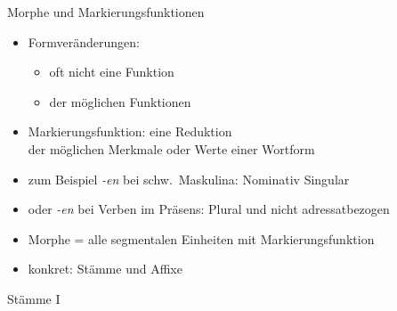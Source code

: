 \begin{frame}
  {Morphe und Markierungsfunktionen}
  \pause
  \begin{itemize}[<+->]
    \item Formveränderungen:
      \begin{itemize}[<+->]
        \item oft nicht \alert{eine} Funktion
        \item {} der möglichen Funktionen
      \end{itemize}
   \Halbzeile 
    \item \alert{Markierungsfunktion}: eine \alert{Reduktion}\\
      der möglichen Merkmale oder Werte einer Wortform
    \item zum Beispiel \textit{-en} bei schw.\ Maskulina:  Nominativ Singular
    \item oder \textit{-en} bei Verben im Präsens: Plural und nicht adressatbezogen
      \Halbzeile
    \item \alert{Morphe = alle segmentalen Einheiten mit Markierungsfunktion}
    \item konkret: \alert{Stämme} und \alert{Affixe}
  \end{itemize}
\end{frame}

\begin{frame}
  {Stämme I}
  \pause
  \begin{exe}
    \ex
    \begin{xlist}
        \pause
        \pause
    \end{xlist}
  \end{exe}
\end{frame}

